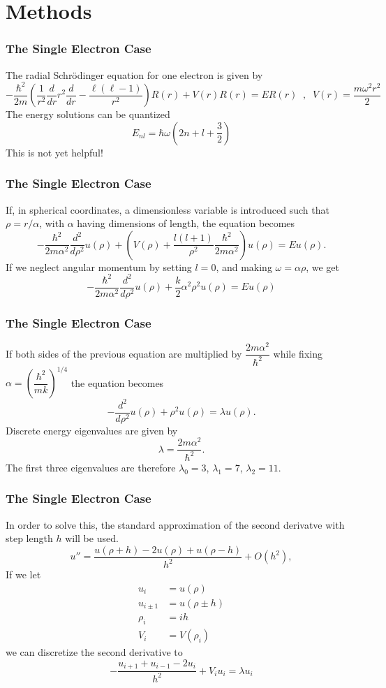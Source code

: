 \documentclass[10pt,xcolor={x11names}]{beamer}
\begin{document}
	\section{Methods}

		\begin{frame}
			\frametitle{The Single Electron Case}
			The radial Schr\"{o}dinger equation for one electron is given by
			\[ -\dfrac{\hbar^2}{2m} \left( \dfrac{1}{r^2} \dfrac{d}{dr}r^2\dfrac{d}{dr} - \dfrac{\ell (\ell -1)}{r^2} \right) R(r) + V(r) R(r) = E R(r) \;\; , \;\; V(r) = \dfrac{m\omega^2 r^2}{2} \]
			The energy solutions can be quantized
			\[ E_{nl} = \hbar \omega \left( 2n+l+\dfrac{3}{2} \right) \]
			This is not yet helpful!
		\end{frame}

		\begin{frame} \frametitle{The Single Electron Case}
			If, in spherical coordinates, a dimensionless variable is introduced such that $\rho = r/\alpha$, with $\alpha$ having dimensions of length, the equation becomes
			\[ -\dfrac{\hbar^2}{2m\alpha^2} \dfrac{d^2}{d\rho^2} u(\rho) + \left( V(\rho) + \dfrac{l(l+1)}{\rho^2} \dfrac{\hbar^2}{2m\alpha^2} \right) u(\rho) = Eu(\rho). \]
			If we neglect angular momentum by setting $l=0$, and making $\omega = \alpha \rho$, we get
    		\[ -\dfrac{\hbar^2}{2m\alpha^2} \dfrac{d^2}{d\rho^2} u(\rho) + \dfrac{k}{2} \alpha^2 \rho^2 u(\rho) = Eu(\rho) \]
		\end{frame}

		\begin{frame} \frametitle{The Single Electron Case}
			If both sides of the previous equation are multiplied by $\dfrac{2m\alpha^2}{\hbar^2}$ while fixing $\alpha = \left( \dfrac{\hbar^2}{mk} \right)^{1/4}$ the equation becomes
    		\[ -\dfrac{d^2}{d\rho^2} u(\rho)+ \rho^2 u(\rho) = \lambda u(\rho). \]
    		Discrete energy eigenvalues are given by
    		\[ \lambda = \dfrac{2m\alpha^2}{\hbar^2}. \]
    		The first three eigenvalues are therefore $\lambda_0 = 3$, $\lambda_1 = 7$, $\lambda_2 = 11$. 
		\end{frame}

		\begin{frame} \frametitle{The Single Electron Case}
			In order to solve this, the standard approximation of the second derivatve with step length $h$ will be used.
    		\[ u'' = \dfrac{u(\rho+h)-2u(\rho)+u(\rho-h)}{h^2} + O(h^2) , \]
    		If we let 
    		\begin{align*}
    			u_i &= u(\rho)\\
    			u_{i\pm 1} &= u(\rho \pm h) \\
    			\rho_i &= ih \\
    			V_i &= V(\rho_i)
    		\end{align*}
    		we can discretize the second derivative to
    		\[ -\dfrac{u_{i+1} + u_{i-1} - 2u_i}{h^2} + V_i u_i = \lambda u_i \]
		\end{frame}
\end{document}
